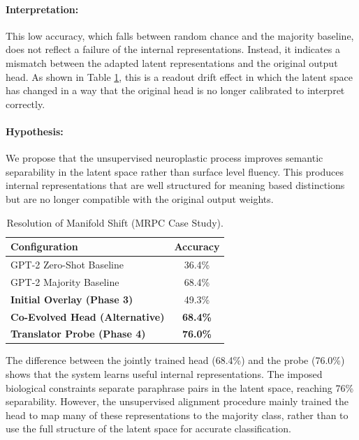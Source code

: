 \documentclass[11pt, letterpaper]{article}
\begin{document}
\paragraph{Interpretation:} This low accuracy, which falls between random chance and the majority baseline, does not reflect a failure of the internal representations. Instead, it indicates a mismatch between the adapted latent representations and the original output head. As shown in Table \ref{tab:manifold_resolution}, this is a readout drift effect in which the latent space has changed in a way that the original head is no longer calibrated to interpret correctly.
\paragraph{Hypothesis:} We propose that the unsupervised neuroplastic process improves semantic separability in the latent space rather than surface level fluency. This produces internal representations that are well structured for meaning based distinctions but are no longer compatible with the original output weights.

\begin{table}[htbp]
    \centering
    \caption{Resolution of Manifold Shift (MRPC Case Study).}
    \label{tab:manifold_resolution}
    \begin{tabular}{@{} l c @{}}
        \toprule
        \textbf{Configuration} & \textbf{Accuracy} \\
        \midrule
        GPT-2 Zero-Shot Baseline & 36.4\% \\
        GPT-2 Majority Baseline  & 68.4\% \\
        \textbf{Initial Overlay (Phase 3)} & 49.3\% \\
        \textbf{Co-Evolved Head (Alternative)} & \textbf{68.4\%} \\
        \textbf{Translator Probe (Phase 4)}    & \textbf{76.0\%} \\
        \bottomrule
    \end{tabular}
\end{table}

The difference between the jointly trained head (68.4\%) and the probe (76.0\%) shows that the system learns useful internal representations. The imposed biological constraints separate paraphrase pairs in the latent space, reaching 76\% separability. However, the unsupervised alignment procedure mainly trained the head to map many of these representations to the majority class, rather than to use the full structure of the latent space for accurate classification.
\end{document}
